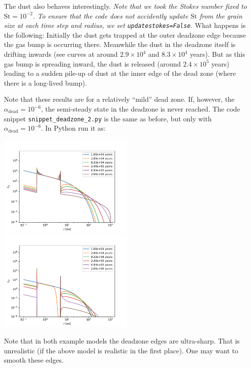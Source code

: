 \documentclass{book}
\newcommand{\code}[1]{{\small\tt #1}}
\begin{document}
The dust also behaves interestingly. {\em Note that we took the Stokes number
  fixed to $\mathrm{St}=10^{-2}$. To ensure that the code does not accidently
  update $\mathrm{St}$ from the grain size at each time step and radius, we set
  \code{updatestokes=False}.} What happens is the following: Initially the dust
gets trapped at the outer deadzone edge because the gas bump is occurring
there. Meanwhile the dust in the deadzone itself is drifting inwards (see curves
at around $2.9\times 10^4$ and $8.3\times 10^4$ years). But as this gas bump is
spreading inward, the dust is released (around $2.4\times 10^5$ years) leading
to a sudden pile-up of dust at the inner edge of the dead zone (where there is
a long-lived bump).

Note that these results are for a relatively ``mild'' dead zone. If, however,
the $\alpha_{\mathrm{dead}}=10^{-6}$, the semi-steady state in the deadzone is
never reached. The code snippet
\code{snippet\_deadzone\_2.py} is the same as before, but only with
$\alpha_{\mathrm{dead}}=10^{-6}$. In Python run it as:
\begin{codebox}
\end{codebox}
\centerline{\includegraphics[width=0.5\textwidth]{../snippets/fig_snippet_deadzone_2_1.pdf}
  \includegraphics[width=0.5\textwidth]{../snippets/fig_snippet_deadzone_2_2.pdf}}

Note that in both example models the deadzone edges are ultra-sharp. That is
unrealistic (if the above model is realistic in the first place). One may want
to smooth these edges.
\end{document}
